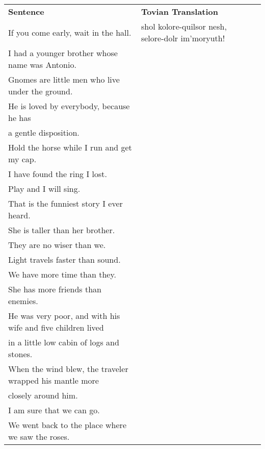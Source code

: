 \begin{tabular}{l|l l}
\textbf{Sentence} & \textbf{Tovian Translation} &\\ 
 
If you come early, wait in the hall. & shol kolore-quilsor nesh, selore-dolr im'moryuth!&\\
 
I had a younger brother whose name was Antonio. & &\\
 
Gnomes are little men who live under the ground. & &\\
 
He is loved by everybody, because he has  &\\ \indent  a gentle disposition. & &\\
 
Hold the horse while I run and get my cap. & &\\
 
I have found the ring I lost. & &\\
 
Play and I will sing. & &\\
 
That is the funniest story I ever heard. & &\\
 
She is taller than her brother. & &\\
 
They are no wiser than we. & &\\
 
Light travels faster than sound. & &\\
 
We have more time than they. & &\\
 
She has more friends than enemies. & &\\
 
He was very poor, and with his wife and five children lived  &\\ \indent in a little low cabin of logs and stones. & &\\
 
When the wind blew, the traveler wrapped his mantle more  &\\ \indent closely around him. & &\\
 
I am sure that we can go. & &\\
 
We went back to the place where we saw the roses. & &\\


\end{tabular}
